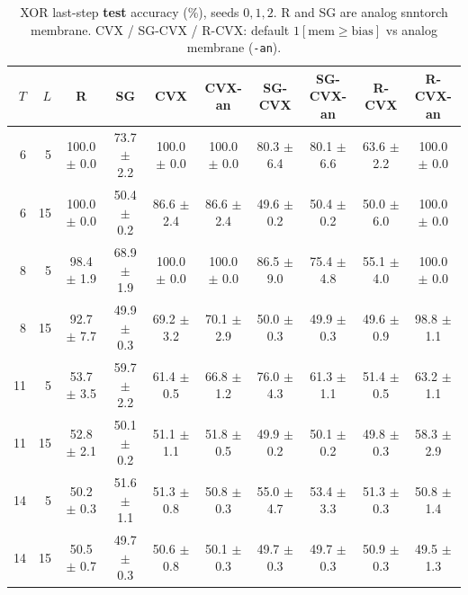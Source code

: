 \documentclass[11pt]{article}
\begin{document}
\begin{table}[t]
\centering
\small
\caption{XOR last-step \textbf{test} accuracy (\%), seeds $0,1,2$.
R and SG are analog snntorch membrane. CVX / SG-CVX / R-CVX: default $1[\mathrm{mem}\ge\mathrm{bias}]$ vs analog membrane (\texttt{-an}).}
\label{tab:xor-test-mean}
\begin{tabular}{rrcccccccc}
\toprule
$T$ & $L$ & R & SG & CVX & CVX-an & SG-CVX & SG-CVX-an & R-CVX & R-CVX-an \\
\midrule
6 & 5 & 100.0 $\pm$ 0.0 & 73.7 $\pm$ 2.2 & 100.0 $\pm$ 0.0 & 100.0 $\pm$ 0.0 & 80.3 $\pm$ 6.4 & 80.1 $\pm$ 6.6 & 63.6 $\pm$ 2.2 & 100.0 $\pm$ 0.0 \\
6 & 15 & 100.0 $\pm$ 0.0 & 50.4 $\pm$ 0.2 & 86.6 $\pm$ 2.4 & 86.6 $\pm$ 2.4 & 49.6 $\pm$ 0.2 & 50.4 $\pm$ 0.2 & 50.0 $\pm$ 6.0 & 100.0 $\pm$ 0.0 \\
8 & 5 & 98.4 $\pm$ 1.9 & 68.9 $\pm$ 1.9 & 100.0 $\pm$ 0.0 & 100.0 $\pm$ 0.0 & 86.5 $\pm$ 9.0 & 75.4 $\pm$ 4.8 & 55.1 $\pm$ 4.0 & 100.0 $\pm$ 0.0 \\
8 & 15 & 92.7 $\pm$ 7.7 & 49.9 $\pm$ 0.3 & 69.2 $\pm$ 3.2 & 70.1 $\pm$ 2.9 & 50.0 $\pm$ 0.3 & 49.9 $\pm$ 0.3 & 49.6 $\pm$ 0.9 & 98.8 $\pm$ 1.1 \\
11 & 5 & 53.7 $\pm$ 3.5 & 59.7 $\pm$ 2.2 & 61.4 $\pm$ 0.5 & 66.8 $\pm$ 1.2 & 76.0 $\pm$ 4.3 & 61.3 $\pm$ 1.1 & 51.4 $\pm$ 0.5 & 63.2 $\pm$ 1.1 \\
11 & 15 & 52.8 $\pm$ 2.1 & 50.1 $\pm$ 0.2 & 51.1 $\pm$ 1.1 & 51.8 $\pm$ 0.5 & 49.9 $\pm$ 0.2 & 50.1 $\pm$ 0.2 & 49.8 $\pm$ 0.3 & 58.3 $\pm$ 2.9 \\
14 & 5 & 50.2 $\pm$ 0.3 & 51.6 $\pm$ 1.1 & 51.3 $\pm$ 0.8 & 50.8 $\pm$ 0.3 & 55.0 $\pm$ 4.7 & 53.4 $\pm$ 3.3 & 51.3 $\pm$ 0.3 & 50.8 $\pm$ 1.4 \\
14 & 15 & 50.5 $\pm$ 0.7 & 49.7 $\pm$ 0.3 & 50.6 $\pm$ 0.8 & 50.1 $\pm$ 0.3 & 49.7 $\pm$ 0.3 & 49.7 $\pm$ 0.3 & 50.9 $\pm$ 0.3 & 49.5 $\pm$ 1.3 \\
\bottomrule
\end{tabular}
\end{table}
\end{document}
